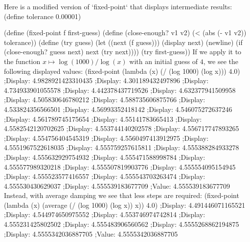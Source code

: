 Here is a modified version of `fixed-point` that displays intermediate results:
\begtt\scm 
(define tolerance 0.00001)

(define (fixed-point f first-guess)
  (define (close-enough? v1 v2)
    (< (abs (- v1 v2)) tolerance))
  (define (try guess)
    (let ((next (f guess)))
      (display next)
      (newline)
      (if (close-enough? guess next)
        next
        (try next))))
  (try first-guess))
\endtt
If we apply it to the function $x \mapsto \log(1000)/\log(x)$ with an initial guess of $4$, we see the following displayed values:
\begtt\scm 
(fixed-point (lambda (x) (/ (log 1000) (log x))) 4.0)
;Display: 4.9828921423310435
;Display: 4.301189432497896
;Display: 4.734933901055578
;Display: 4.442378437719526
;Display: 4.632377941509958
;Display: 4.505830646780212
;Display: 4.588735606875766
;Display: 4.533824356566501
;Display: 4.56993352418142
;Display: 4.546075272637246
;Display: 4.561789745175654
;Display: 4.55141783665413
;Display: 4.5582542120702625
;Display: 4.553744140202578
;Display: 4.556717747893265
;Display: 4.554756404545319
;Display: 4.5560497413912975
;Display: 4.5551967522618035
;Display: 4.555759257615811
;Display: 4.555388284933278
;Display: 4.555632929754932
;Display: 4.555471588998784
;Display: 4.555577989320218
;Display: 4.555507819903776
;Display: 4.555554095154945
;Display: 4.555523577416557
;Display: 4.555543703263474
;Display: 4.555530430629037
;Display: 4.555539183677709
;Value: 4.555539183677709
\endtt
Instead, with average damping we see that less steps are required:
\begtt\scm
(fixed-point (lambda (x) (average (/ (log 1000) (log x)) x)) 4.0)
;Display: 4.491446071165521
;Display: 4.544974650975552
;Display: 4.553746974742814
;Display: 4.555231425802502
;Display: 4.555483906560562
;Display: 4.5555268862194875
;Display: 4.5555342036887705
;Value: 4.5555342036887705
\endtt
